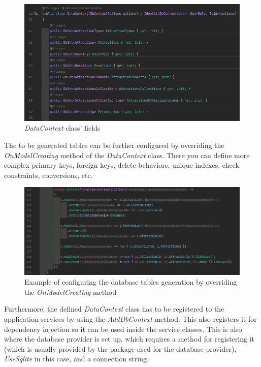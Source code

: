 \begin{figure}[!ht]
    \centering
    \includegraphics[width=1\linewidth]{4.3.1_dataContext.png}
    \caption{\textit{DataContext} class' fields}
    \label{fig:enter-label}
\end{figure}

\par The to be generated tables can be further configured by overriding the \textit{OnModelCreating} method of the \textit{DataContext} class. There you can define more complex primary keys, foreign keys, delete behaviors, unique indexes, check constraints, conversions, etc.

\clearpage %

\begin{figure}[!ht]
    \centering
    \includegraphics[width=0.95\linewidth]{4.3.1_sample-of-OnModelCreating.png}
    \caption{Example of configuring the database tables generation by overriding the \textit{OnModelCreating} method}
    \label{fig:enter-label}
\end{figure}

\par Furthermore, the defined \textit{DataContext} class has to be registered to the application services by using the \textit{AddDbContext} method. This also registers it for dependency injection so it can be used inside the service classes. This is also where the database provider is set up, which requires a method for registering it (which is usually provided by the package used for the database provider), \textit{UseSqlite} in this case, and a connection string.

